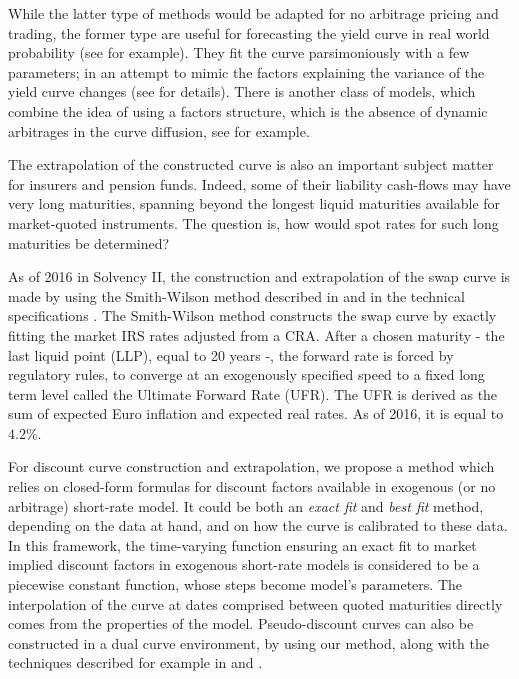 \medskip

While the latter type of methods would be adapted for no arbitrage pricing and trading, the former type are useful for forecasting the yield curve in real world probability (see \cite{diebold2006forecasting} for example). They fit the curve parsimoniously with a few parameters; in an attempt to mimic the factors explaining the variance of the yield curve changes (see \cite{litterman1991volatility} for details). There is another class of models, which combine the idea of using a factors structure, which is the absence of dynamic arbitrages in the curve diffusion, see \cite{christensen2011affine} for example.

\medskip

The extrapolation of the constructed curve is also an important subject matter for insurers and pension funds. Indeed, some of their liability cash-flows may have very long maturities, spanning beyond the longest liquid maturities available for market-quoted instruments. The question is, how would spot rates for such long maturities be determined?

\medskip

As of 2016 in Solvency II, the construction and extrapolation of the swap curve is made by using the Smith-Wilson method described in \newline \cite{smithwilson2001} and in the technical specifications \cite{EIOPA2015}. The Smith-Wilson method constructs the swap curve by exactly fitting the market IRS rates adjusted from a CRA. After a chosen maturity - the last liquid point (LLP), equal to 20 years -, the forward rate is forced by  regulatory rules, to converge at an exogenously specified speed to a fixed long term level called the Ultimate Forward Rate (UFR). The UFR is  derived as the sum of expected Euro inflation and expected real rates. As of 2016, it is equal to $4.2\%$.  \medskip

For discount curve construction and extrapolation, we propose a method which relies on closed-form formulas for discount factors available in exogenous (or no arbitrage)  short-rate model. It could be both an {\it exact fit} and {\it best fit} method, depending on the data at hand, and on how the curve is calibrated to these data. In this framework, the time-varying function ensuring an exact fit to market implied discount factors in exogenous short-rate models is considered to be a piecewise constant function, whose steps become model's parameters. The interpolation of the curve at dates comprised between quoted maturities directly comes from the properties of the model. Pseudo-discount curves can also be constructed in a dual curve environment, by using our method, along with the techniques described for example in \cite{white2012multiple} and \cite{ametrano2013everything}.
\medskip

